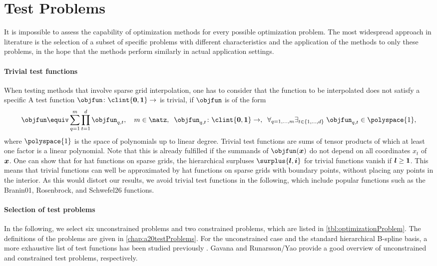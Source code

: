 \section{Test Problems}
\label{sec:52testProblems}

It is impossible to assess the capability of optimization methods
for every possible optimization problem.
The most widespread approach in literature
is the selection of a subset of specific problems
with different characteristics  and
the application of the methods to only these problems,
in the hope that the methods perform similarly in
actual application settings.

\paragraph{Trivial test functions}

When testing methods that involve sparse grid interpolation,
one has to consider that the function to be interpolated
does not satisfy a specific 
A test function $\objfun\colon \clint{\*0, \*1} \to \real$ is trivial, if
$\objfun$ is of the form
\begin{equation}
  \objfun \equiv \sum_{q=1}^m \prod_{t=1}^d \objfun_{q,t},\quad
  m \in \natz,\;\;
  \objfun_{q,t}\colon \clint{\*0, \*1} \to \real,\;\;
  \faex{q = 1, \dotsc, m}{t \in \{1, \dotsc, d\}}{
    \objfun_{q,t} \in \polyspace{1},
  }
\end{equation}
where $\polyspace{1}$ is the space of polynomials up to linear degree.
Trivial test functions are sums of tensor products of which at
least one factor is a linear polynomial.
Note that this is already fulfilled if the summands of $\objfun(\*x)$
do not depend on all coordinates $x_t$ of ${\boldsymbol{x}}$.
One can show that for hat functions on sparse grids,
the hierarchical surpluses $\surplus{\*l,\*i}$ for trivial functions
vanish if ${\boldsymbol{l}} \ge {\boldsymbol{1}}$.
This means that trivial functions can well be approximated by hat functions
on sparse grids with boundary points, without placing any points
in the interior.
As this would distort our results,
we avoid trivial test functions in the following,
which include popular functions such as the
Branin01, Rosenbrock, and Schwefel26 functions.

\paragraph{Selection of test problems}

In the following, we select six unconstrained problems
and two constrained problems, which are listed in
\cref{tbl:optimizationProblem}.
The definitions of the problems are given in \cref{chap:a20testProblems}.
For the unconstrained case and the standard hierarchical
B-spline basis, a more exhaustive list of test functions has been
studied previously \cite{Valentin14Hierarchische}.
Gavana \cite{Gavana13Global} and Runarsson/Yao \cite{Runarsson00Stochastic}
provide a good overview of unconstrained and constrained test problems,
respectively.

